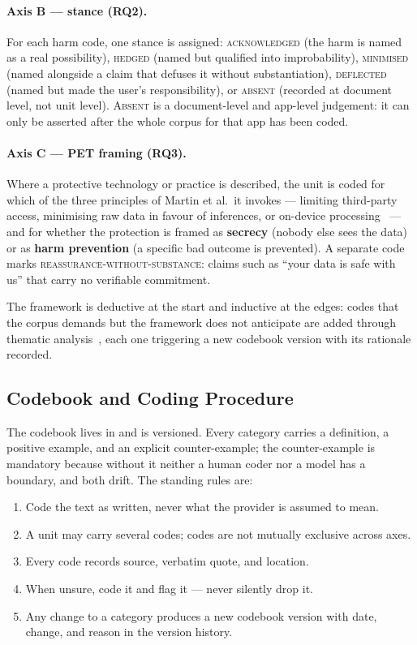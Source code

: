 \paragraph{Axis B --- stance (RQ2).}
For each harm code, one stance is assigned: \textsc{acknowledged} (the harm is
named as a real possibility), \textsc{hedged} (named but qualified into
improbability), \textsc{minimised} (named alongside a claim that defuses it
without substantiation), \textsc{deflected} (named but made the user's
responsibility), or \textsc{absent} (recorded at document level, not unit
level). \textsc{Absent} is a document-level and app-level judgement: it can only
be asserted after the whole corpus for that app has been coded.

\paragraph{Axis C --- PET framing (RQ3).}
Where a protective technology or practice is described, the unit is coded for
which of the three principles of Martin et al.\ it invokes --- limiting
third-party access, minimising raw data in favour of inferences, or on-device
processing~\parencite{martin2025cookies} --- and for whether the protection is
framed as \textbf{secrecy} (nobody else sees the data) or as \textbf{harm
prevention} (a specific bad outcome is prevented). A separate code marks
\textsc{reassurance-without-substance}: claims such as \enquote{your data is
safe with us} that carry no verifiable commitment.

The framework is deductive at the start and inductive at the edges: codes that
the corpus demands but the framework does not anticipate are added through
thematic analysis~\parencite{braun2006using}, each one triggering a new codebook
version with its rationale recorded.

\subsection{Codebook and Coding Procedure}

The codebook lives in  and is versioned. Every
category carries a definition, a positive example, and an explicit
counter-example; the counter-example is mandatory because without it neither a
human coder nor a model has a boundary, and both drift. The standing rules are:

\begin{enumerate}[leftmargin=*,itemsep=1pt]
  \item Code the text as written, never what the provider is assumed to mean.
  \item A unit may carry several codes; codes are not mutually exclusive across
        axes.
  \item Every code records source, verbatim quote, and location.
  \item When unsure, code it and flag it --- never silently drop it.
  \item Any change to a category produces a new codebook version with date,
        change, and reason in the version history.
\end{enumerate}

